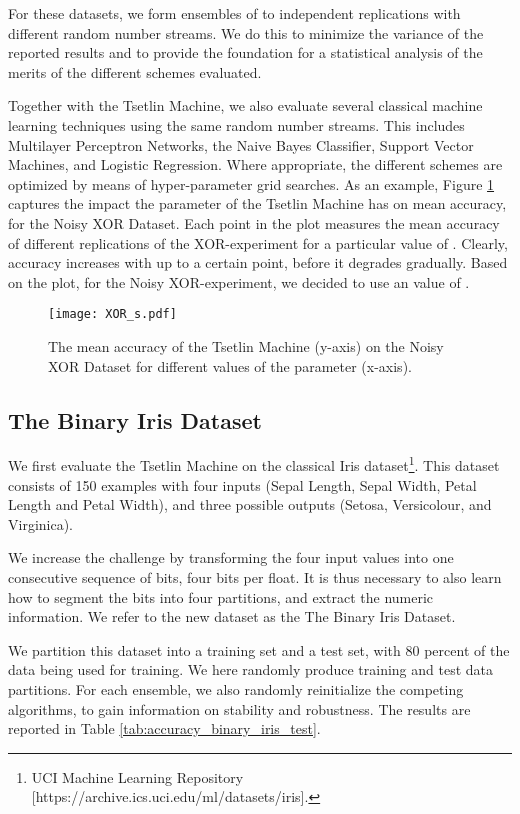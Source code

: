 \documentclass[11pt,a4paper]{article}
\begin{document}
For these datasets, we form ensembles of  to  independent replications with different random number streams. We do this to minimize the variance of the reported results and to provide the foundation for a statistical analysis of the merits of the different schemes evaluated. 

Together with the Tsetlin Machine, we also evaluate several classical machine learning techniques using the same random number streams. This  includes Multilayer Perceptron Networks, the Naive Bayes Classifier, Support Vector Machines, and Logistic Regression. Where appropriate, the different schemes are optimized by means of hyper-parameter grid searches.
As an example, Figure \ref{figure:xor_s} captures the impact the  parameter of the Tsetlin Machine has on mean accuracy, for the Noisy XOR Dataset. Each point in the plot measures the mean accuracy of  different replications of the XOR-experiment for a particular value of . Clearly, accuracy increases with  up to a certain point, before it degrades gradually. Based on the plot, for the Noisy XOR-experiment, we decided to use an  value of .

\begin{figure}[!ht]
\centering
\texttt{[image: XOR\_s.pdf]}
\caption{The mean accuracy of the Tsetlin Machine (y-axis) on the Noisy XOR Dataset for different values of the parameter  (x-axis).}
\label{figure:xor_s}
\end{figure}

\subsection{The Binary Iris Dataset}

We first evaluate the Tsetlin Machine on the classical Iris dataset\footnote{UCI Machine Learning Repository [https://archive.ics.uci.edu/ml/datasets/iris].}. This dataset consists of 150 examples with four inputs (Sepal Length, Sepal Width, Petal Length and Petal Width), and three possible outputs (Setosa, Versicolour, and Virginica).

We increase the challenge by transforming the four input values into one consecutive sequence of  bits, four bits per float. It is thus necessary to also learn how to segment the  bits into four partitions, and extract the numeric information. We refer to the new dataset as the The Binary Iris Dataset.

We partition this dataset into a training set and a test set, with 80 percent of the data being used for training. We here randomly produce  training and test data partitions. For each ensemble, we also randomly reinitialize the competing algorithms, to gain information on stability and robustness. The results are reported in Table \ref{tab:accuracy_binary_iris_test}.
\end{document}
